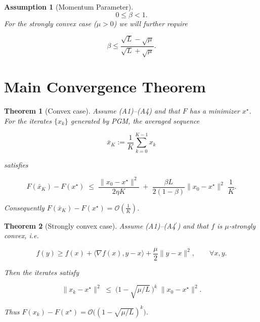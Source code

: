 \documentclass{article}
\newtheorem{theorem}{Theorem}
\newtheorem{assumption}{Assumption}
\begin{document}
\begin{assumption}[Momentum Parameter]
\[
0\le\beta<1. \tag{A4}
\]
For the strongly convex case ($\mu>0$) we will further require  

\[
\beta\le\frac{\sqrt{L}-\sqrt{\mu}}{\sqrt{L}+\sqrt{\mu}}. \tag{A4$^\prime$}
\]
\end{assumption}

\section*{Main Convergence Theorem}
\begin{theorem}[Convex case]\label{thm:convex}
Assume (A1)–(A4) and that $F$ has a minimizer $x^\star$.  
For the iterates $\{x_k\}$ generated by PGM, the averaged sequence  

\[
\bar{x}_K:=\frac{1}{K}\sum_{k=0}^{K-1}x_k
\]

satisfies  

\[
F(\bar{x}_K)-F(x^\star)\;\le\;\frac{\|x_0-x^\star\|^2}{2\eta K}\;+\;\frac{\beta L}{2(1-\beta)}\|x_0-x^\star\|^2\;\frac{1}{K}. \tag{3}
\]

Consequently $F(\bar{x}_K)-F(x^\star)=\mathcal{O}\!\left(\frac{1}{K}\right)$. 
\end{theorem}

\begin{theorem}[Strongly convex case]\label{thm:strong}
Assume (A1)–(A4$^\prime$) and that $f$ is $\mu$‑strongly convex, i.e.  

\[
f(y)\ge f(x)+\langle\nabla f(x),y-x\rangle+\frac{\mu}{2}\|y-x\|^2,\qquad\forall x,y. \tag{A5}
\]

Then the iterates satisfy  

\[
\|x_k-x^\star\|^2 \;\le\; \bigl(1-\sqrt{\mu/L}\,\bigr)^k\;\|x_0-x^\star\|^2. \tag{4}
\]

Thus $F(x_k)-F(x^\star)=\mathcal{O}\!\bigl((1-\sqrt{\mu/L})^k\bigr)$. 
\end{theorem}
\end{document}

